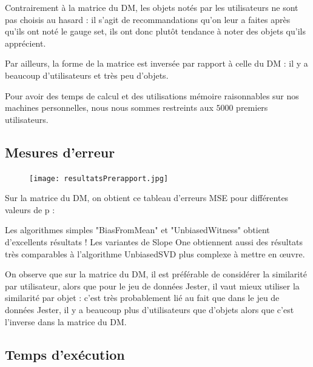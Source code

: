 \documentclass[11pt, openany, a4paper]{article}
\begin{document}
		Contrairement à la matrice du DM, les objets notés par les utilisateurs ne sont pas choisis au hasard : il s'agit de recommandations qu'on leur a faites après qu'ils ont noté le gauge set, ils ont donc plutôt tendance à noter des objets qu'ils apprécient.
		
		Par ailleurs, la forme de la matrice est inversée par rapport à celle du DM : il y a beaucoup d'utilisateurs et très peu d'objets.
		
		Pour avoir des temps de calcul et des utilisations mémoire raisonnables sur nos machines personnelles, nous nous sommes restreints aux $5000$ premiers utilisateurs.
		
	\subsection{Mesures d'erreur}
	
		\begin{figure}[ht!]
			\centering
			\texttt{[image: resultatsPrerapport.jpg]}
		\end{figure}
		Sur la matrice du DM, on obtient ce tableau d'erreurs MSE pour différentes valeurs de p :
		
		
		Les algorithmes simples "BiasFromMean" et "UnbiasedWitness" obtient d'excellents résultats ! Les variantes de Slope One obtiennent aussi des résultats très comparables à l'algorithme UnbiasedSVD plus complexe à mettre en œuvre.
		
		On observe que sur la matrice du DM, il est préférable de considérer la similarité par utilisateur, alors que pour le jeu de données Jester, il vaut mieux utiliser la similarité par objet : c'est très probablement lié au fait que dans le jeu de données Jester, il y a beaucoup plus d'utilisateurs que d'objets alors que c'est l'inverse dans la matrice du DM.
	\subsection{Temps d'exécution}
	
\end{document}
